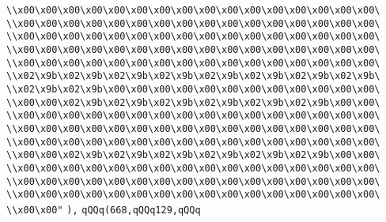 \verb|\\x00\x00\x00\x00\x00\x00\x00\x00\x00\x00\x00\x00\x00\x00\x00\x00\|\newline
\verb|\\x00\x00\x00\x00\x00\x00\x00\x00\x00\x00\x00\x00\x00\x00\x00\x00\|\newline
\verb|\\x00\x00\x00\x00\x00\x00\x00\x00\x00\x00\x00\x00\x00\x00\x00\x00\|\newline
\verb|\\x00\x00\x00\x00\x00\x00\x00\x00\x00\x00\x00\x00\x00\x00\x00\x00\|\newline
\verb|\\x00\x00\x00\x00\x00\x00\x00\x00\x00\x00\x00\x00\x00\x00\x00\x00\|\newline
\verb|\\x02\x9b\x02\x9b\x02\x9b\x02\x9b\x02\x9b\x02\x9b\x02\x9b\x02\x9b\|\newline
\verb|\\x02\x9b\x02\x9b\x00\x00\x00\x00\x00\x00\x00\x00\x00\x00\x00\x00\|\newline
\verb|\\x00\x00\x02\x9b\x02\x9b\x02\x9b\x02\x9b\x02\x9b\x02\x9b\x00\x00\|\newline
\verb|\\x00\x00\x00\x00\x00\x00\x00\x00\x00\x00\x00\x00\x00\x00\x00\x00\|\newline
\verb|\\x00\x00\x00\x00\x00\x00\x00\x00\x00\x00\x00\x00\x00\x00\x00\x00\|\newline
\verb|\\x00\x00\x00\x00\x00\x00\x00\x00\x00\x00\x00\x00\x00\x00\x00\x00\|\newline
\verb|\\x00\x00\x02\x9b\x02\x9b\x02\x9b\x02\x9b\x02\x9b\x02\x9b\x00\x00\|\newline
\verb|\\x00\x00\x00\x00\x00\x00\x00\x00\x00\x00\x00\x00\x00\x00\x00\x00\|\newline
\verb|\\x00\x00\x00\x00\x00\x00\x00\x00\x00\x00\x00\x00\x00\x00\x00\x00\|\newline
\verb|\\x00\x00\x00\x00\x00\x00\x00\x00\x00\x00\x00\x00\x00\x00\x00\x00\|\newline
\verb|\\x00\x00"|\newline
\verb|),|\newline
\verb|qQQq(668,qQQq129,qQQq|\newline
